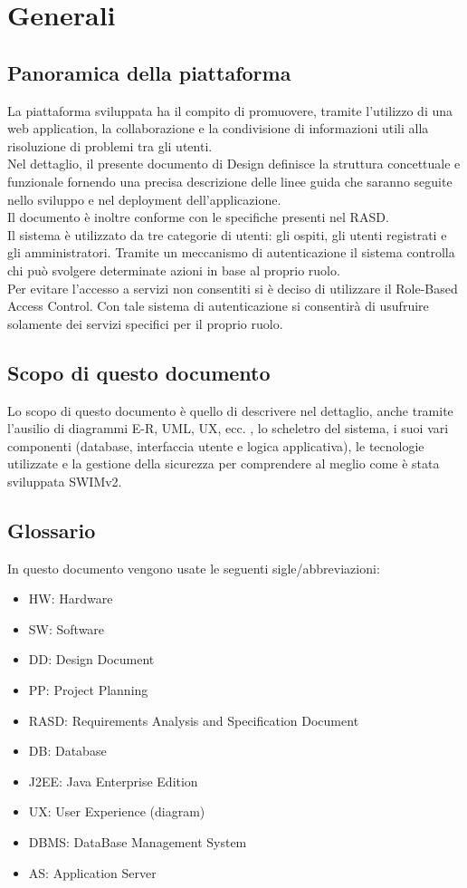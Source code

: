 \section{Generali}


\subsection{Panoramica della piattaforma}
La piattaforma sviluppata ha il compito di promuovere, tramite l’utilizzo di una web application, la collaborazione e la condivisione di informazioni utili alla risoluzione di problemi tra gli utenti.\\[1\baselineskip]Nel dettaglio, il presente documento di Design definisce la struttura concettuale e funzionale fornendo una precisa descrizione delle linee guida che saranno seguite nello sviluppo e nel deployment dell’applicazione.\\[1\baselineskip]Il documento è inoltre conforme con le specifiche presenti nel RASD.\\[1\baselineskip]Il sistema è utilizzato da tre categorie di utenti: gli ospiti, gli utenti registrati e gli amministratori. Tramite un meccanismo di autenticazione il sistema controlla chi può svolgere determinate azioni in base al proprio ruolo.\\[1\baselineskip]Per evitare l’accesso a servizi non consentiti si è deciso di utilizzare il Role-Based Access Control. Con tale sistema di autenticazione si consentirà di usufruire solamente dei servizi specifici per il proprio ruolo.


\subsection{Scopo di questo documento}
Lo scopo di questo documento è quello di descrivere nel dettaglio, anche tramite l'ausilio di diagrammi E-R, UML, UX, ecc. , lo scheletro del sistema, i suoi vari componenti (database,
interfaccia utente e logica applicativa), le tecnologie utilizzate e la gestione della sicurezza per comprendere al meglio come è stata sviluppata SWIMv2.

\subsection{Glossario}
In questo documento vengono usate le seguenti sigle/abbreviazioni:
\begin{itemize}
 \item HW: Hardware
 \item SW: Software
 \item DD: Design Document
 \item PP: Project Planning
 \item RASD: Requirements Analysis and Specification Document
 \item DB: Database
 \item J2EE: Java Enterprise Edition
 \item UX: User Experience (diagram)
 \item DBMS: DataBase Management System
 \item AS: Application Server
\end{itemize}

\pagebreak


